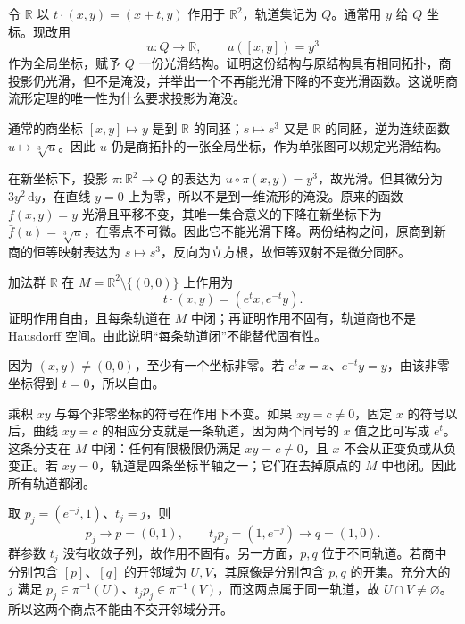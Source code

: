 \begin{exercise}\label{g1:ex:smooth-quotient-without-submersion}
	令 \(\mathbb R\) 以 \(t\cdot(x,y)=(x+t,y)\) 作用于 \(\mathbb R^2\)，轨道集记为 \(Q\)。通常用 \(y\) 给 \(Q\) 坐标。现改用
	\[
		u:Q\longrightarrow\mathbb R,\qquad u([x,y])=y^3
	\]
	作为全局坐标，赋予 \(Q\) 一份光滑结构。证明这份结构与原结构具有相同拓扑，商投影仍光滑，但不是淹没，并举出一个不再能光滑下降的不变光滑函数。这说明商流形定理的唯一性为什么要求投影为淹没。
\end{exercise}
\begin{solution}
	通常的商坐标 \([x,y]\mapsto y\) 是到 \(\mathbb R\) 的同胚；\(s\mapsto s^3\) 又是 \(\mathbb R\) 的同胚，逆为连续函数 \(u\mapsto\sqrt[3]{u}\)。因此 \(u\) 仍是商拓扑的一张全局坐标，作为单张图可以规定光滑结构。

	在新坐标下，投影 \(\pi:\mathbb R^2\to Q\) 的表达为 \(u\circ\pi(x,y)=y^3\)，故光滑。但其微分为 \(3y^2\,\mathrm{d}y\)，在直线 \(y=0\) 上为零，所以不是到一维流形的淹没。原来的函数 \(f(x,y)=y\) 光滑且平移不变，其唯一集合意义的下降在新坐标下为 \(\bar f(u)=\sqrt[3]{u}\)，在零点不可微。因此它不能光滑下降。两份结构之间，原商到新商的恒等映射表达为 \(s\mapsto s^3\)，反向为立方根，故恒等双射不是微分同胚。
\end{solution}

\begin{exercise}\label{g1:ex:closed-orbits-nonproper-action}
	加法群 \(\mathbb R\) 在 \(M=\mathbb R^2\setminus\{(0,0)\}\) 上作用为
	\[
		t\cdot(x,y)=(e^t x,e^{-t}y).
	\]
	证明作用自由，且每条轨道在 \(M\) 中闭；再证明作用不固有，轨道商也不是 Hausdorff 空间。由此说明“每条轨道闭”不能替代固有性。
\end{exercise}
\begin{solution}
	因为 \((x,y)\ne(0,0)\)，至少有一个坐标非零。若 \(e^t x=x\)、\(e^{-t}y=y\)，由该非零坐标得到 \(t=0\)，所以自由。

	乘积 \(xy\) 与每个非零坐标的符号在作用下不变。如果 \(xy=c\ne0\)，固定 \(x\) 的符号以后，曲线 \(xy=c\) 的相应分支就是一条轨道，因为两个同号的 \(x\) 值之比可写成 \(e^t\)。这条分支在 \(M\) 中闭：任何有限极限仍满足 \(xy=c\ne0\)，且 \(x\) 不会从正变负或从负变正。若 \(xy=0\)，轨道是四条坐标半轴之一；它们在去掉原点的 \(M\) 中也闭。因此所有轨道都闭。

	取 \(p_j=(e^{-j},1)\)、\(t_j=j\)，则
	\[
		p_j\longrightarrow p=(0,1),\qquad
		t_jp_j=(1,e^{-j})\longrightarrow q=(1,0).
	\]
	群参数 \(t_j\) 没有收敛子列，故作用不固有。另一方面，\(p,q\) 位于不同轨道。若商中分别包含 \([p]\)、\([q]\) 的开邻域为 \(U,V\)，其原像是分别包含 \(p,q\) 的开集。充分大的 \(j\) 满足 \(p_j\in\pi^{-1}(U)\)、\(t_jp_j\in\pi^{-1}(V)\)，而这两点属于同一轨道，故 \(U\cap V\ne\varnothing\)。所以这两个商点不能由不交开邻域分开。
\end{solution}


